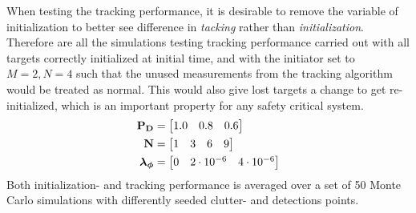 When testing the tracking performance, it is desirable to remove the variable of initialization to better see difference in \emph{tacking} rather than \emph{initialization}. Therefore are all the simulations testing tracking performance carried out with all targets correctly initialized at initial time, and with the initiator set to \(M=2, N=4\) such that the unused measurements from the tracking algorithm would be treated as normal. This would also give lost targets a change to get re-initialized, which is an important property for any safety critical system.
\begin{equation}\label{eq:tracking_test_table}
\begin{split}
\boldsymbol{\mathbf{P_D}} &= \begin{bmatrix} 1.0 & 0.8 & 0.6 \end{bmatrix} \\
\boldsymbol{\mathbf{N}} &= \begin{bmatrix} 1 & 3 & 6 & 9 \end{bmatrix} \\
\boldsymbol{\mathbf{\lambda_\phi}} &= \begin{bmatrix} 0 & 2\cdot10^{-6} & 4\cdot10^{-6} \end{bmatrix}
\end{split}
\end{equation}
Both initialization- and tracking performance is averaged over a set of 50 Monte Carlo simulations with differently seeded clutter- and detections points.

